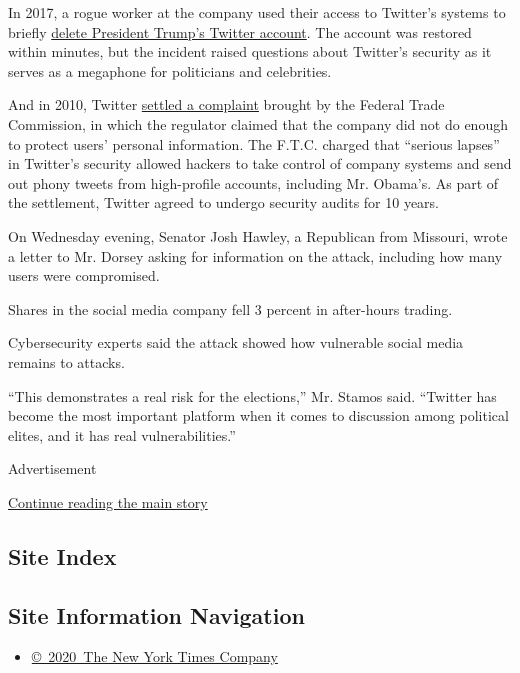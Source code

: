 In 2017, a rogue worker at the company used their access to Twitter's
systems to briefly
\href{https://www.nytimes.com/2017/11/03/technology/trump-twitter-deleted.html}{delete
President Trump's Twitter account}. The account was restored within
minutes, but the incident raised questions about Twitter's security as
it serves as a megaphone for politicians and celebrities.

And in 2010, Twitter
\href{https://www.ftc.gov/news-events/press-releases/2010/06/twitter-settles-charges-it-failed-protect-consumers-personal}{settled
a complaint} brought by the Federal Trade Commission, in which the
regulator claimed that the company did not do enough to protect users'
personal information. The F.T.C. charged that ``serious lapses'' in
Twitter's security allowed hackers to take control of company systems
and send out phony tweets from high-profile accounts, including Mr.
Obama's. As part of the settlement, Twitter agreed to undergo security
audits for 10 years.

On Wednesday evening, Senator Josh Hawley, a Republican from Missouri,
wrote a letter to Mr. Dorsey asking for information on the attack,
including how many users were compromised.

Shares in the social media company fell 3 percent in after-hours
trading.

Cybersecurity experts said the attack showed how vulnerable social media
remains to attacks.

``This demonstrates a real risk for the elections,'' Mr. Stamos said.
``Twitter has become the most important platform when it comes to
discussion among political elites, and it has real vulnerabilities.''

Advertisement

\protect\hyperlink{after-bottom}{Continue reading the main story}

\hypertarget{site-index}{%
\subsection{Site Index}\label{site-index}}

\hypertarget{site-information-navigation}{%
\subsection{Site Information
Navigation}\label{site-information-navigation}}

\begin{itemize}
\tightlist
\item
  \href{https://help.nytimes.com/hc/en-us/articles/115014792127-Copyright-notice}{©~2020~The
  New York Times Company}
\end{itemize}

